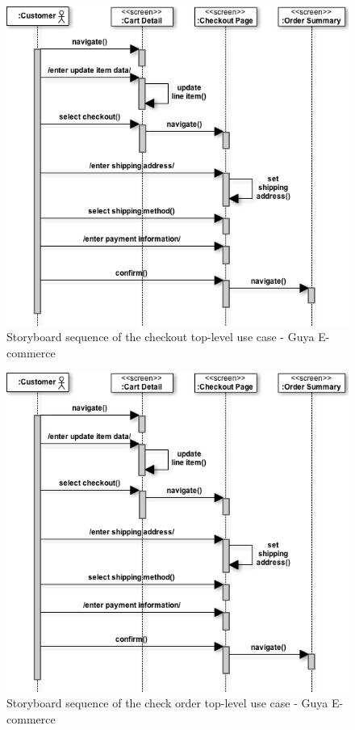 \begin{figure}[!h]
\center
\includegraphics[keepaspectratio, width=15cm]{sequence-diagrams/checkout-storyboard.png}
\caption{Storyboard sequence of the checkout top-level use case - Guya E-commerce}
\end{figure}

\begin{figure}[!h]
\center
\includegraphics[keepaspectratio, width=15cm]{sequence-diagrams/checkout-storyboard.png}
\caption{Storyboard sequence of the check order top-level use case - Guya E-commerce}
\end{figure}

